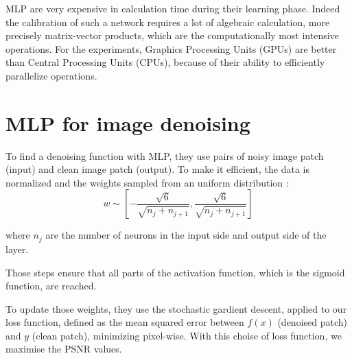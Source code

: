\documentclass[10pt,a4paper]{article}
\newcommand{\svs}{\vspace{9pt}}
\begin{document}

\svs 



MLP are very expensive in calculation time during their learning phase. Indeed the calibration of such a network requires a lot of algebraic calculation, more precisely matrix-vector products, which are the computationally most intensive operations.
For the experiments, Graphics Processing Units (GPUs) are better than Central Processing Units (CPUs), because of their ability to efficiently parallelize operations.

\svs







\section{MLP for image denoising}


To find a denoising function with MLP, they use pairs of noisy image patch (input) and clean image patch (output). To make it efficient, the data is normalized and the weights sampled from an uniform distribution :  \\%
$$w \sim [-\frac{\sqrt{6}}{\sqrt{n_j + n_{j+1}}}, \frac{\sqrt{6}}{\sqrt{n_j + n_{j+1}}} ]$$ 

\svs
where $n_j$ are the number of neurons in the input side and output side of the layer. 

Those steps ensure that all parts of the activation function, which is the sigmoid function, are reached.

To update those weights, they use the stochastic gardient descent, applied to our loss function, defined as the mean squared error between $f(x)$ (denoised patch) and $y$ (clean patch), minimizing pixel-wise. With this choise of loss function, we maximise the PSNR values. %
\end{document}
